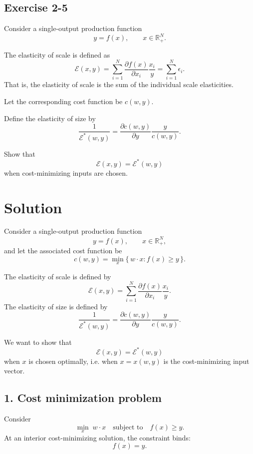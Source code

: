 \vspace{30pt}
\begin{tcolorbox}[breakable]

\subsection*{Exercise 2-5}

Consider a single-output production function
\[
y=f(x), \qquad x \in \mathbb{R}_+^N.
\]

The elasticity of scale is defined as
\[
\mathcal{E}(x,y)
=
\sum_{i=1}^N \frac{\partial f(x)}{\partial x_i}\frac{x_i}{y}
=
\sum_{i=1}^N \epsilon_i.
\]
That is, the elasticity of scale is the sum of the individual scale elasticities.

Let the corresponding cost function be $c(w,y)$.

Define the elasticity of size by
\[
\frac{1}{\mathcal{E}^*(w,y)}
=
\frac{\partial c(w,y)}{\partial y}\frac{y}{c(w,y)}.
\]

Show that
\[
\mathcal{E}(x,y)=\mathcal{E}^*(w,y)
\]
when cost-minimizing inputs are chosen.

\end{tcolorbox}



\section*{Solution}

Consider a single-output production function
\[
y=f(x), \qquad x\in \mathbb{R}_+^N,
\]
and let the associated cost function be
\[
c(w,y)=\min_x \{\, w\cdot x : f(x)\ge y \,\}.
\]

The elasticity of scale is defined by
\[
\mathcal E(x,y)
=
\sum_{i=1}^N \frac{\partial f(x)}{\partial x_i}\frac{x_i}{y}.
\]
The elasticity of size is defined by
\[
\frac{1}{\mathcal E^*(w,y)}
=
\frac{\partial c(w,y)}{\partial y}\frac{y}{c(w,y)}.
\]

We want to show that
\[
\mathcal E(x,y)=\mathcal E^*(w,y)
\]
when \(x\) is chosen optimally, i.e. when \(x=x(w,y)\) is the cost-minimizing input vector.

\subsection*{1. Cost minimization problem}

Consider
\[
\min_x \; w\cdot x
\quad \text{subject to} \quad
f(x)\ge y.
\]
At an interior cost-minimizing solution, the constraint binds:
\[
f(x)=y.
\]

